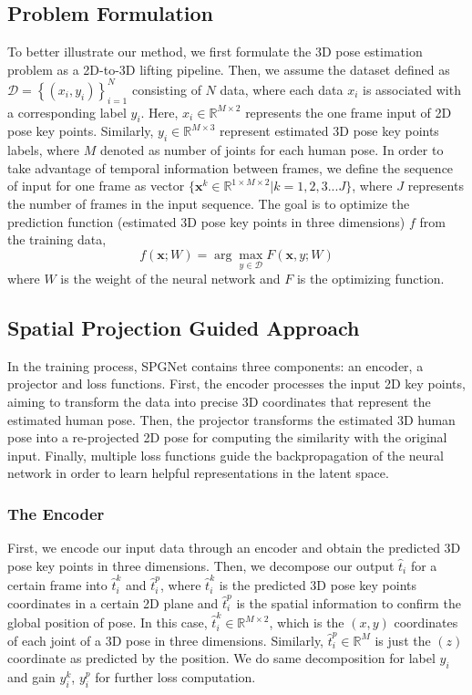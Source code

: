 \documentclass[runningheads]{llncs}
\begin{document}
\subsection{Problem Formulation}
To better illustrate our method, we first formulate the 3D pose estimation problem as a 2D-to-3D lifting pipeline. Then, we assume the dataset defined as \(\mathcal{D} = \left\{\left(x_i,y_i\right)\right\}^{N}_{i=1}\) consisting of \(N\) data, where each data \(x_i\) is associated with a corresponding label \(y_i\). Here, \(x_i \in \mathbb{R}^{M \times 2}\) represents the one frame input of 2D pose key points. Similarly, \(y_i \in \mathbb{R}^{M \times 3}\) represent estimated 3D pose key points labels, where \(M\) denoted as number of joints for each human pose. In order to take advantage of temporal information between frames, we define the sequence of input for one frame as vector \(\{\textbf{x}^k \in \mathbb{R}^{1 \times M \times 2} | k = 1,2,3...J\}\), where \(J\) represents the number of frames in the input sequence. The goal is to optimize the prediction function (estimated 3D pose key points in three dimensions) \(f\) from the training data,
\begin{equation}
f(\textbf{x};W) = \arg \max_{y \in \mathcal{D}} F(\textbf{x},y;W)
\end{equation}
where \(W\) is the weight of the neural network and \(F\) is the optimizing function.
\label{subsec:formulation}

\subsection{Spatial Projection Guided Approach} \label{subsec:approach}

In the training process, SPGNet contains three components: an encoder, a projector and loss functions. First, the encoder processes the input 2D key points, aiming to transform the data into precise 3D coordinates that represent the estimated human pose. Then, the projector transforms the estimated 3D human pose into a re-projected 2D pose for computing the similarity with the original input. Finally, multiple loss functions guide the backpropagation of the neural network in order to learn helpful representations in the latent space.

\subsubsection{The Encoder} First, we encode our input data through an encoder and obtain the predicted 3D pose key points in three dimensions. Then, we decompose our output \(\hat{t}_{i}\) for a certain frame into \(\hat{t}_{i}^{k}\) and \(\hat{t}_{i}^{p}\), where \(\hat{t}_{i}^{k}\) is the predicted 3D pose key points coordinates in a certain 2D plane and \(\hat{t}_{i}^{p}\) is the spatial information to confirm the global position of pose. In this case, \(\hat{t}_{i}^{k} \in \mathbb{R}^{M \times 2}\), which is the \((x,y)\) coordinates of each joint of a 3D pose in three dimensions. Similarly, \(\hat{t}_{i}^{p} \in \mathbb{R}^{M}\) is just the \((z)\) coordinate as predicted by the position. We do same decomposition for label \(y_i\) and gain \(y_i^{k}\), \(y_i^{p}\) for further loss computation.
\end{document}
